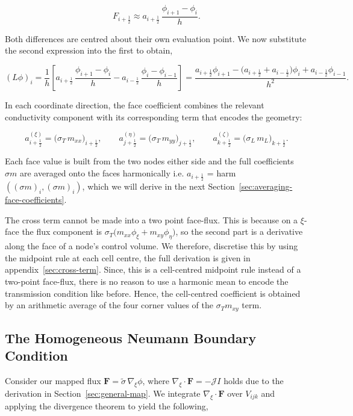 \documentclass[final-report]{report-template}
\begin{document}
$$
F_{i+\frac12} \approx a_{i+\frac12}\,\frac{\phi_{i+1}-\phi_i}{h}.
$$

Both differences are centred about their own evaluation point. We now substitute the second expression into the first to obtain,

$$
(L\phi)_i=\frac{1}{h}\left[a_{i+\frac12}\,\frac{\phi_{i+1}-\phi_i}{h}
-a_{i-\frac12}\,\frac{\phi_i-\phi_{i-1}}{h}\right]
=\frac{a_{i+\frac12}\phi_{i+1}-\big(a_{i+\frac12}+a_{i-\frac12}\big)\phi_i+a_{i-\frac12}\phi_{i-1}}{h^2}.
$$

In each coordinate direction, the face coefficient combines the relevant conductivity component with its corresponding term that encodes the geometry:

$$
a^{(\xi)}_{i+\frac12} = \big(\sigma_T\, m_{xx}\big)_{i+\frac12}, \qquad
a^{(\eta)}_{j+\frac12} = \big(\sigma_T\, m_{yy}\big)_{j+\frac12}, \qquad
a^{(\zeta)}_{k+\frac12} = \big(\sigma_L\, m_L\big)_{k+\frac12}.
$$

Each face value is built from the two nodes either side and the full coefficients $\sigma m$ are averaged onto the faces harmonically i.e. $a_{i + \frac{1}{2}}$ = harm$((\sigma m)_i, (\sigma m)_i)$, which we will derive in the next Section~\ref{sec:averaging-face-coefficients}.

The cross term cannot be made into a two point face-flux. This is because on a $\xi$-face the flux component is $\sigma_T\big(m_{xx}\phi_\xi+m_{xy}\phi_\eta\big)$, so the second part is a derivative along the face of a node's control volume. We therefore, discretise this by using the midpoint rule at each cell centre, the full derivation is given in appendix~\ref{sec:cross-term}. Since, this is a cell-centred midpoint rule instead of a two-point face-flux, there is no reason to use a harmonic mean to encode the transmission condition like before. Hence, the cell-centred coefficient is obtained by an arithmetic average of the four corner values of the $\sigma_Tm_{xy}$ term.

\subsection{The Homogeneous Neumann Boundary Condition}
\label{sec:neumann}

Consider our mapped flux $\mathbf F = \tilde\sigma\,\nabla_\xi\phi$, where $\nabla_\xi\cdot\mathbf F = -\mathcal J I$ holds due to the derivation in Section~\ref{sec:general-map}. We integrate $\nabla_\xi\cdot\mathbf F$ over $V_{ijk}$ and applying the divergence theorem to yield the following,
\end{document}
